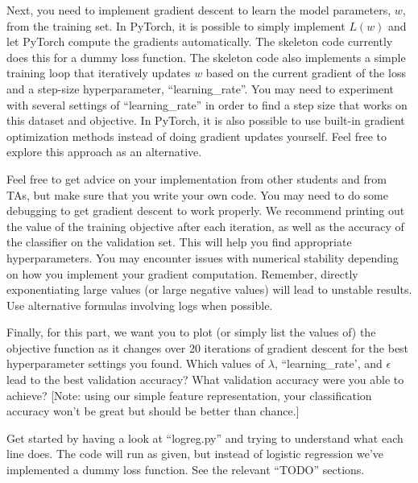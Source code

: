 \documentclass[10pt]{report}
\begin{document}
\begin{enumerate}
\begin{enumerate}
\vspace{0.5em}
Next, you need to implement gradient descent to learn the model parameters, $w$, from the training set. In PyTorch, it is possible to simply implement $L(w)$ and let PyTorch compute the gradients automatically. The skeleton code currently does this for a dummy loss function. The skeleton code also implements a simple training loop that iteratively updates $w$ based on the current gradient of the loss and a step-size hyperparameter, ``learning\_rate''. You may need to experiment with several settings of ``learning\_rate'' in order to find a step size that works on this dataset and objective. In PyTorch, it is also possible to use built-in gradient optimization methods instead of doing gradient updates yourself. Feel free to explore this approach as an alternative.  

\vspace{0.5em}
Feel free to get advice on your implementation from other students and from TAs, but make sure that you write your own code. You may need to do some debugging to get gradient descent to work properly. We recommend printing out the value of the training objective after each iteration, as well as the accuracy of the classifier on the validation set. This will help you find appropriate hyperparameters. You may encounter issues with numerical stability depending on how you implement your gradient computation. Remember, directly exponentiating large values (or large negative values) will lead to unstable results. Use alternative formulas involving logs when possible. 

\vspace{0.5em}
Finally, for this part, we want you to plot (or simply list the values of) the objective function as it changes over 20 iterations of gradient descent for the best hyperparameter settings you found. Which values of $\lambda$, ``learning\_rate', and $\epsilon$ lead to the best validation accuracy? What validation accuracy were you able to achieve? [Note: using our simple feature representation, your classification accuracy won't be great but should be better than chance.]

\vspace{0.5em}
Get started by having a look at ``logreg.py'' and trying to understand what each line does. The code will run as given, but instead of logistic regression we've implemented a dummy loss function. See the relevant ``TODO'' sections.
\begin{solution}

\end{solution}


\end{enumerate}
\end{enumerate}
\end{document}
